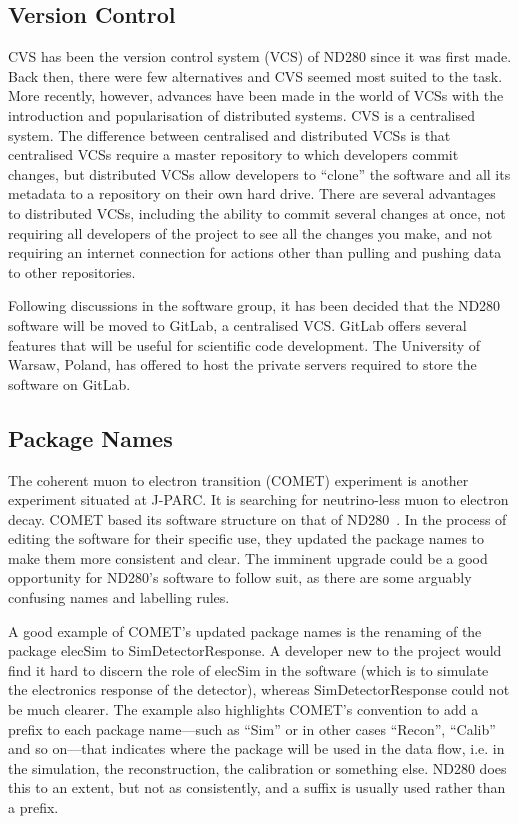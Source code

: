 \documentclass[aps,pra,12pt,notitlepage,tightenlines]{revtex4-1}
\begin{document}
\subsection{Version Control}
CVS has been the version control system (VCS) of ND280 since it was first made. Back then, there were few alternatives and CVS seemed most suited to the task. More recently, however, advances have been made in the world of VCSs with the introduction and popularisation of distributed systems. CVS is a centralised system. The difference between centralised and distributed VCSs is that centralised VCSs require a master repository to which developers commit changes, but distributed VCSs allow developers to ``clone'' the software and all its metadata to a repository on their own hard drive. There are several advantages to distributed VCSs, including the ability to commit several changes at once, not requiring all developers of the project to see all the changes you make, and not requiring an internet connection for actions other than pulling and pushing data to other repositories.

Following discussions in the software group, it has been decided that the ND280 software will be moved to GitLab, a centralised VCS. GitLab offers several features that will be useful for scientific code development. The University of Warsaw, Poland, has offered to host the private servers required to store the software on GitLab.

\subsection{Package Names}
The coherent muon to electron transition (COMET) experiment is another experiment situated at J-PARC. It is searching for neutrino-less muon to electron decay. COMET based its software structure on that of ND280~\cite{Wu2017}. In the process of editing the software for their specific use, they updated the package names to make them more consistent and clear. The imminent upgrade could be a good opportunity for ND280's software to follow suit, as there are some arguably confusing names and labelling rules.

A good example of COMET's updated package names is the renaming of the package elecSim to SimDetectorResponse. A developer new to the project would find it hard to discern the role of elecSim in the software (which is to simulate the electronics response of the detector), whereas SimDetectorResponse could not be much clearer. The example also highlights COMET's convention to add a prefix to each package name---such as ``Sim'' or in other cases ``Recon'', ``Calib'' and so on---that indicates where the package will be used in the data flow, i.e. in the simulation, the reconstruction, the calibration or something else. ND280 does this to an extent, but not as consistently, and a suffix is usually used rather than a prefix. 
\end{document}
